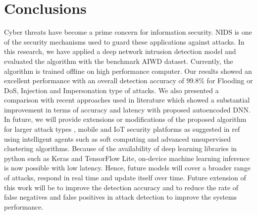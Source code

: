 \documentclass[letterpaper, 10pt, conference]{ieeeconf} %
\begin{document}
 

\section{Conclusions} \label{sec:conclusions}
 Cyber threats have become a prime concern for information security. NIDS is one of the security mechanisms used to guard these applications against attacks. In this research, we have applied a deep network intrusion detection model and evaluated the algorithm with the benchmark AIWD dataset. Currently, the algorithm is trained offline on high performance computer. Our  results  showed  an  excellent  performance  with  an overall  detection  accuracy  of  99.8\%  for  Flooding or DoS, Injection and  Impersonation type  of attacks. We also presented a comparison with recent approaches used in literature which showed a substantial improvement in terms of accuracy and latency with proposed autoencoded DNN. In future, we will provide extensions or modifications of the proposed algorithm for larger attack types , mobile and IoT security platforms as suggested in ref \cite{abdulhammed2018machine} using intelligent agents  such as soft computing and advanced unsupervised clustering algorithms. Because of the availability of deep learning libraries in python such as Keras and TensorFlow Lite, on-device machine learning inference is now possible with low latency. Hence, future models will cover a broader range of attacks, respond in real time and update itself over time. Future extension of this work will be to improve the detection accuracy and to reduce the rate of false negatives and false positives in attack detection to improve the systems performance.
 \FloatBarrier

\renewcommand*{\bibfont}{\small}
\printbibliography
\end{document}
